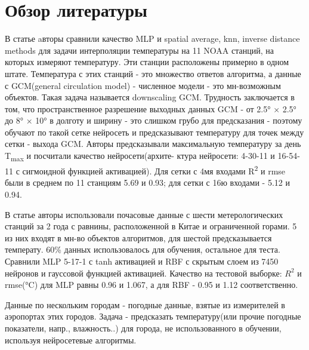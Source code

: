 \documentclass[11pt]{article}
\begin{document}
\section{Обзор литературы}
\label{sec:org7565eff}
В статье \cite{Spatial-Interpolation-2000-Snell} aвторы сравнили
  качество MLP и spatial average, knn, inverse distance methods для
  задачи интерполяции температуры на 11 NOAA станций, на которых
  измеряют температуру. Эти станции расположены примерно в одном
  штате. Температура с этих станций - это множество ответов алгоритма,
  а данные с GCM(general circulation model) - численное модели - это
  мн-возможным объектов. Такая задача называется downscaling
  GCM. Трудность заключается в том, что пространственное разрешение
  выходных данных GCM - от 2.5° × 2.5° до 8° × 10° в долготу и
  ширину - это слишком грубо для предсказания - поэтому обучают по
  такой сетке нейросеть и предсказывают температуру для точек между
  сетки - выхода GCM. Авторы предсказывали максимальную температуру за
  день T\textsubscript{max} и посчитали качество нейросети(архите- ктура нейросети:
  4-30-11 и 16-54-11 с сигмоидной функцией активацией). Для сетки с
  4мя входами R\textsuperscript{2} и rmse были в среднем по 11 станциям 5.69 и 0.93;
  для сетки с 16ю входами - 5.12 и 0.94.

В статье \cite{nn-prediction-hourly-mean-temp-Tasadduq-2002} авторы
использовали почасовые данные с шести метерологических станций за 2
года с равнины, расположенной в Китае и ограниченной горами. 5 из
них входят в мн-во объектов алгоритмов, для шестой предсказывается
температу.  60\% данных использовалось для обучения, остальное для
теста. Сравнили MLP 5-17-1 с tanh активацией и RBF с скрытым слоем
из 7450 нейронов и гауссовой функцией активацией. Качество на
тестовой выборке: \(R^2\) и rmse(°C) для MLP равны 0.96 и 1.067, а для
RBF - 0.95 и 1.12 соответственно.

  Данные по нескольким городам - погодные данные, взятые из измерителей в аэропортах этих городов.
Задача - предсказать температуру(или прочие погодные показатели, напр., влажность..) для города, не использованного
в обучении,  используя нейросетевые алгоритмы.
\end{document}
